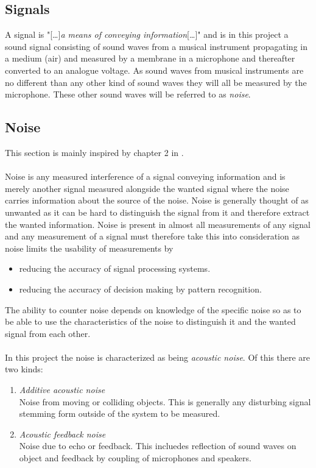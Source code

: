 \subsection{Signals}
A signal is "[\dots]\textit{a means of conveying information}[\dots]" \cite{signal_noise} and is in this project a sound signal consisting of sound waves from a musical instrument propagating in a medium (air) and measured by a membrane in a microphone and thereafter converted to an analogue voltage. As sound waves from musical instruments are no different than any other kind of sound waves they will all be measured by the microphone. These other sound waves will be referred to as \textit{noise}.
\subsection{Noise}
This section is mainly inspired by chapter 2 in \cite{signal_noise}.\\\\Noise is any measured interference of a signal conveying information and is merely another signal measured alongside the wanted signal where the noise carries information about the source of the noise.  Noise is generally thought of as unwanted as it can be hard to distinguish the signal from it and therefore extract the wanted information. Noise is present in almost all measurements of any signal and any measurement of a signal must therefore take this into consideration as noise limits the usability of measurements by
\begin{itemize}
\item reducing the accuracy of signal processing systems.
\item reducing the accuracy of decision making by pattern recognition.
\end{itemize}
The ability to counter noise depends on knowledge of the specific noise so as to be able to use the characteristics of the noise to distinguish it and the wanted signal from each other.
\\\\
In this project the noise is characterized as being \textit{acoustic noise}. Of this there are two kinds:
\begin{enumerate}
\item \textit{Additive acoustic noise}\\
Noise from moving or colliding objects. This is generally any disturbing signal stemming form outside of the system to be measured.
\item \textit{Acoustic feedback noise}\\
Noise due to echo or feedback. This incluedes reflection of sound waves on object and feedback by coupling of microphones and speakers.
\end{enumerate}
